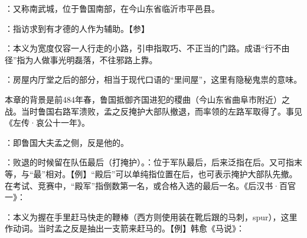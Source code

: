 {
\item {}：又称南武城，位于鲁国南部，在今山东省临沂市平邑县。
\item {}：指访求到有才德的人作为辅助。【参】
\item {}：本义为宽度仅容一人行走的小路，引申指取巧、不正当的门路。成语“行不由径”指为人做事光明磊落，不往邪路上靠。
\item {}：房屋内厅堂之后的部分，相当于现代口语的“里间屋”，这里有隐秘鬼祟的意味。
}
{}  %


{本章的背景是前484年春，鲁国抵御齐国进犯的稷曲（今山东省曲阜市附近）之战。当时鲁国右路军溃败，孟之反掩护大部队撤退，而率领的左路军取得了。事见《左传·哀公十一年》。
\begin{lyitemize}
\item {}：即鲁国大夫孟之侧，反是他的。
\item {}：败退的时候留在队伍最后（打掩护）。：位于军队最后，后来泛指在后。又可指末等，与“最”相对。【例】“殿后”可以单纯指位置在后，也可表示掩护大部队先撤。在考试、竞赛中，“殿军”指倒数第一名，或合格入选的最后一名。《后汉书·百官一》：
\item {}：本义为握在手里赶马快走的鞭棒（西方则使用装在靴后跟的马刺，spur），这里作动词。当时孟之反是抽出一支箭来赶马的。【例】韩愈《马说》：
\end{lyitemize}
}
{}


